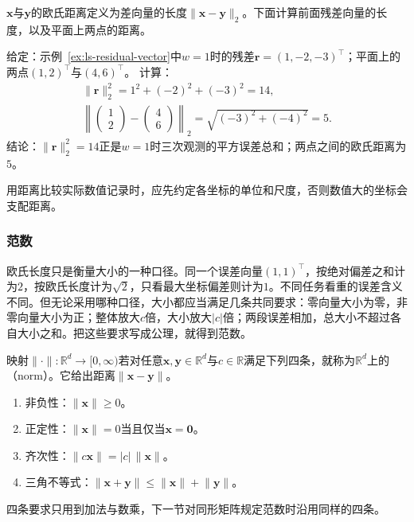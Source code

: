 $\bm x$与$\bm y$的欧氏距离定义为差向量的长度$\lVert\bm x-\bm y\rVert_2$。下面计算前面残差向量的长度，以及平面上两点的距离。
\begin{example}[长度与距离的计算]
\label{ex:ls-length-distance}
给定：示例~\ref{ex:ls-residual-vector}中$w=1$时的残差$\bm r=(1,-2,-3)^\top$；平面上的两点$(1,2)^\top$与$(4,6)^\top$。
计算：
\[
 \begin{gathered}
 \lVert\bm r\rVert_2^2=1^2+(-2)^2+(-3)^2=14,\\
 \left\lVert\begin{pmatrix}1\\2\end{pmatrix}-\begin{pmatrix}4\\6\end{pmatrix}\right\rVert_2=\sqrt{(-3)^2+(-4)^2}=5.
 \end{gathered}
\]
结论：$\lVert\bm r\rVert_2^2=14$正是$w=1$时三次观测的平方误差总和；两点之间的欧氏距离为$5$。
\end{example}
用距离比较实际数值记录时，应先约定各坐标的单位和尺度，否则数值大的坐标会支配距离。

\subsubsection{范数}

欧氏长度只是衡量大小的一种口径。同一个误差向量$(1,1)^\top$，按绝对偏差之和计为$2$，按欧氏长度计为$\sqrt2$，只看最大坐标偏差则计为$1$。不同任务看重的误差含义不同。但无论采用哪种口径，大小都应当满足几条共同要求：零向量大小为零，非零向量大小为正；整体放大$c$倍，大小放大$|c|$倍；两段误差相加，总大小不超过各自大小之和。把这些要求写成公理，就得到范数。
\begin{definition}[范数]
\label{def:functional-normed-space}
映射$\lVert\cdot\rVert:\mathbb R^d\to[0,\infty)$若对任意$\bm x,\bm y\in\mathbb R^d$与$c\in\mathbb R$满足下列四条，就称为$\mathbb R^d$上的（norm）。它给出距离$\lVert\bm x-\bm y\rVert$。
\begin{enumerate}
 \item 非负性：$\lVert\bm x\rVert\geq0$。
 \item 正定性：$\lVert\bm x\rVert=0$当且仅当$\bm x=\bm0$。
 \item 齐次性：$\lVert c\bm x\rVert=|c|\,\lVert\bm x\rVert$。
 \item 三角不等式：$\lVert\bm x+\bm y\rVert\leq\lVert\bm x\rVert+\lVert\bm y\rVert$。
\end{enumerate}
\end{definition}
四条要求只用到加法与数乘，下一节对同形矩阵规定范数时沿用同样的四条。

